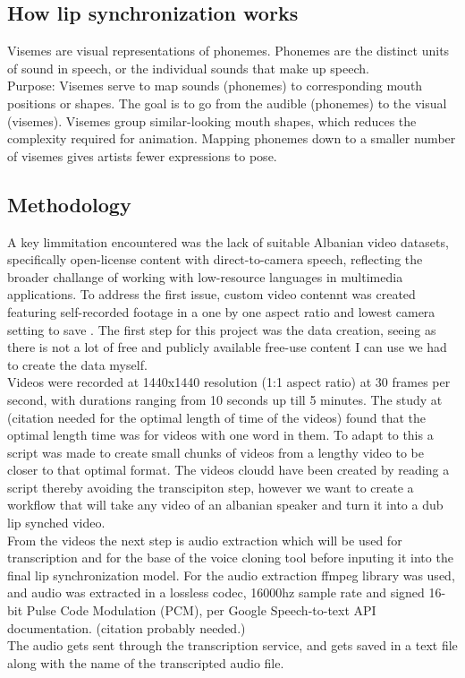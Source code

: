 \documentclass[12pt]{article}
\begin{document}
\subsection{How lip synchronization works}
Visemes are visual representations of phonemes. Phonemes are the distinct units of sound in speech, or the individual sounds that make up speech.\\
Purpose: Visemes serve to map sounds (phonemes) to corresponding mouth positions or shapes. The goal is to go from the audible (phonemes) to the visual (visemes). Visemes group similar-looking mouth shapes, which reduces the complexity required for animation. Mapping phonemes down to a smaller number of visemes gives artists fewer expressions to pose.

\subsection{Methodology}
A key limmitation encountered was the lack of suitable Albanian video datasets, specifically open-license content with direct-to-camera speech, reflecting the broader challange of working with low-resource languages in multimedia applications. To address the first issue, custom video contennt was created featuring self-recorded footage in a one by one aspect ratio and lowest camera setting to save .
The first step for this project was the data creation, seeing as there is not a lot of free and publicly available free-use content I can use we had to create the data myself.\\
Videos were recorded at 1440x1440 resolution (1:1 aspect ratio) at 30 frames per second, with durations ranging from 10 seconds up till 5 minutes. The study at (citation needed for the optimal length of time of the videos) found that the optimal length time was for videos with one word in them. To adapt to this a script was made to create small chunks of videos from a lengthy video to be closer to that optimal format. The videos cloudd have been created by reading a script thereby avoiding the transcipiton step, however we want to create a workflow that will take any video of an albanian speaker and turn it into a dub lip synched video.\\
From the videos the next step is audio extraction which will be used for transcription and for the base of the voice cloning tool before inputing it into the final lip synchronization model. For the audio extraction ffmpeg library was used, and audio was extracted in a lossless codec, 16000hz sample rate and signed 16-bit Pulse Code Modulation (PCM), per Google Speech-to-text API documentation. (citation probably needed.)   
\\
The audio gets sent through the transcription service, and gets saved in a text file along with the name of the transcripted audio file. 
\end{document}
